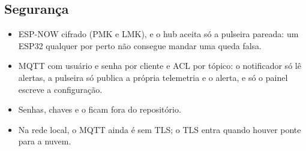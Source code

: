 \subsection{Segurança}

\begin{itemize}
  \item ESP-NOW cifrado (PMK e LMK), e o hub aceita só a pulseira pareada: um ESP32 qualquer
        por perto não consegue mandar uma queda falsa.
  \item MQTT com usuário e senha por cliente e ACL por tópico: o notificador só lê alertas, a
        pulseira só publica a própria telemetria e o alerta, e só o painel escreve a
        configuração.
  \item Senhas, chaves e o  ficam fora do repositório.
  \item Na rede local, o MQTT ainda é sem TLS; o TLS entra quando houver ponte para a nuvem.
\end{itemize}

